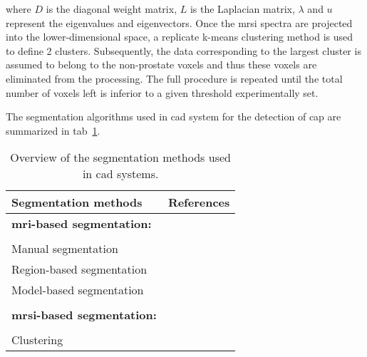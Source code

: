 \begin{enumerate}[leftmargin=*]
\noindent where $D$ is the diagonal weight matrix, $L$ is the Laplacian matrix,
$\lambda$ and $u$ represent the eigenvalues and eigenvectors.
Once the \ac{mrsi} spectra are projected into the lower-dimensional space, a
replicate k-means clustering method is used to define 2 clusters.
Subsequently, the data corresponding to the largest cluster is assumed to
belong to the non-prostate voxels and thus these voxels are eliminated from the
processing.
The full procedure is repeated until the total number of voxels left is
inferior to a given threshold experimentally set.

\end{enumerate}

The segmentation algorithms used in \ac{cad} system for the detection of
\ac{cap} are summarized in \ac{tab}~\ref{tab:summary-seg}.

\begin{table}
  \caption{Overview of the segmentation methods used in \ac{cad} systems.}
  \centering
  \begin{tabular}{l r}
    \toprule
    \textbf{Segmentation methods} & \textbf{References} \\
    \midrule
    \textbf{\ac{mri}-based segmentation:} & \\ \\ [-1.5ex]
    \quad Manual segmentation &
                                \cite{Artan2009,Artan2010,Matulewicz2013,Niaf2011,Niaf2012,Ozer2009,Ozer2010,Puech2009,Vos2008,Vos2008a,Vos2010,Vos2012,trigui2016classification,trigui2017automatic,lehaire2014computer,Lemaitre2016thesis}
    \\
    \quad Region-based segmentation &
                                      \cite{Litjens2012,Litjens2014,rampun2015classifying,rampun2015computer,rampun2016computer,rampun2016computerb,rampun2016quantitative}
    \\
    \quad Model-based segmentation &
                                     \cite{Litjens2011,Viswanath2008a,Viswanath2009,Viswanath2011,Vos2012,giannini2015fully}
    \\ \\ [-1.5ex]
    \textbf{\ac{mrsi}-based segmentation:} & \\ \\ [-1.5ex]
    \quad Clustering & \cite{Tiwari2009} \\
    \bottomrule
  \end{tabular}
  \label{tab:summary-seg}
\end{table}
